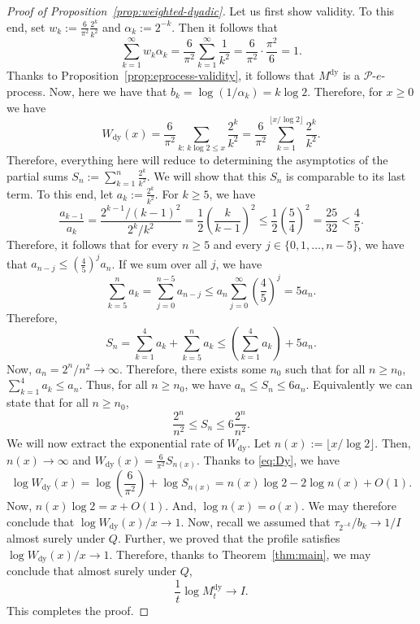 \documentclass{article}
\newcommand{\PP}{\mathcal P}
\theoremstyle{definition}
\begin{document}
\begin{proof}[Proof of Proposition~\ref{prop:weighted-dyadic}]
Let us first show validity. To this end, set $w_k:=\frac{6}{\pi^2}\frac{2^k}{k^2}$ and $\alpha_k:=2^{-k}$. Then it follows that
\[
\sum_{k=1}^{\infty} w_k\alpha_k =\frac{6}{\pi^2}\sum_{k=1}^{\infty}\frac{1}{k^2} = \frac{6}{\pi^2}\cdot\frac{\pi^2}{6}=1.
\]
Thanks to Proposition~\ref{prop:eprocess-validity}, it follows that $M^{\mathrm{dy}}$ is a $\PP$-$e$-process. Now, here we have that $b_k=\log(1/\alpha_k)=k\log 2$. Therefore, for $x\ge0$ we have
\[
W_{\mathrm{dy}}(x) = \frac{6}{\pi^2} \sum_{k:\, k\log 2 \le x} \frac{2^k}{k^2} = \frac{6}{\pi^2} \sum_{k=1}^{\lfloor x/\log 2\rfloor} \frac{2^k}{k^2}.
\]
Therefore, everything here will reduce to determining the asymptotics of the partial sums $S_n:=\sum_{k=1}^n \frac{2^k}{k^2}$. We will show that this $S_n$ is comparable to its last term. To this end, let $a_k:=\frac{2^k}{k^2}$. For $k\ge 5$, we have
\[
\frac{a_{k-1}}{a_k} = \frac{2^{k-1}/(k-1)^2}{2^k/k^2} = \frac12 \left(\frac{k}{k-1}\right)^2 \le \frac12 \left(\frac54\right)^2 = \frac{25}{32} < \frac45.
\]
Therefore, it follows that for every $n\ge 5$ and every $j\in\{0,1,\dots,n-5\}$, we have that $a_{n-j}\le \left(\frac45\right)^{j}a_n$. If we sum over all $j$, we have
\[
\sum_{k=5}^n a_k=\sum_{j=0}^{n-5} a_{n-j}\le a_n \sum_{j=0}^{\infty}\left(\frac45\right)^j = 5a_n.
\]
Therefore, 
\[
S_n = \sum_{k=1}^4 a_k + \sum_{k=5}^n a_k \le \left(\sum_{k=1}^4 a_k\right)+5a_n.
\]
Now, $a_n=2^{n}/n^{2}\to\infty$. Therefore, there exists some $n_0$ such that for all $n\ge n_0$, $\sum_{k=1}^4 a_k\le a_n$. Thus, for all $n\ge n_0$, we have $a_n\le S_n\le 6a_n$. Equivalently we can state that for all $n\ge n_0$,
\begin{equation}\label{eq:Dy}
\frac{2^n}{n^2}\le S_n\le6\frac{2^n}{n^2}.
\end{equation}
We will now extract the exponential rate of $W_{\mathrm{dy}}$. Let $n(x):=\lfloor x/\log 2\rfloor$. Then, $n(x)\to\infty$ and $W_{\mathrm{dy}}(x)=\frac{6}{\pi^2}S_{n(x)}$. Thanks to \eqref{eq:Dy}, we have
\[
\log W_{\mathrm{dy}}(x) = \log\left(\frac{6}{\pi^2}\right) + \log S_{n(x)} = n(x)\log 2 - 2\log n(x) + O(1).
\]
Now, $n(x)\log 2=x+O(1)$. And, $\log n(x)=o(x)$. We may therefore conclude that $\log W_{\mathrm{dy}}(x)/x \to 1$. Now, recall we assumed that $\tau_{2^{-k}}/b_k\to 1/I$ almost surely under $Q$. Further, we proved that the profile satisfies $\log W_{\mathrm{dy}}(x)/x \to 1$. Therefore, thanks to Theorem~\ref{thm:main}, we may conclude that almost surely under $Q$,
\[
\frac1t\log M_t^{\mathrm{dy}}\longrightarrow I.
\]
This completes the proof.
\end{proof}
\end{document}
